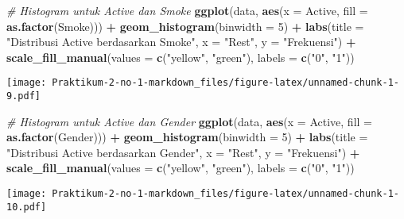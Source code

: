 \documentclass[
]{article}
\newenvironment{Shaded}{\begin{snugshade}}{\end{snugshade}}
\newcommand{\AttributeTok}[1]{\textcolor[rgb]{0.13,0.29,0.53}{#1}}
\newcommand{\CommentTok}[1]{\textcolor[rgb]{0.56,0.35,0.01}{\textit{#1}}}
\newcommand{\DecValTok}[1]{\textcolor[rgb]{0.00,0.00,0.81}{#1}}
\newcommand{\FunctionTok}[1]{\textcolor[rgb]{0.13,0.29,0.53}{\textbf{#1}}}
\newcommand{\NormalTok}[1]{#1}
\newcommand{\SpecialCharTok}[1]{\textcolor[rgb]{0.81,0.36,0.00}{\textbf{#1}}}
\newcommand{\StringTok}[1]{\textcolor[rgb]{0.31,0.60,0.02}{#1}}
\begin{document}
\begin{Shaded}
\begin{Highlighting}[]
\CommentTok{\# Histogram untuk Active dan Smoke}
\FunctionTok{ggplot}\NormalTok{(data, }\FunctionTok{aes}\NormalTok{(}\AttributeTok{x =}\NormalTok{ Active, }\AttributeTok{fill =} \FunctionTok{as.factor}\NormalTok{(Smoke))) }\SpecialCharTok{+}
  \FunctionTok{geom\_histogram}\NormalTok{(}\AttributeTok{binwidth =} \DecValTok{5}\NormalTok{) }\SpecialCharTok{+}
  \FunctionTok{labs}\NormalTok{(}\AttributeTok{title =} \StringTok{"Distribusi Active berdasarkan Smoke"}\NormalTok{,}
       \AttributeTok{x =} \StringTok{"Rest"}\NormalTok{,}
       \AttributeTok{y =} \StringTok{"Frekuensi"}\NormalTok{) }\SpecialCharTok{+}
  \FunctionTok{scale\_fill\_manual}\NormalTok{(}\AttributeTok{values =} \FunctionTok{c}\NormalTok{(}\StringTok{"yellow"}\NormalTok{, }\StringTok{"green"}\NormalTok{), }\AttributeTok{labels =} \FunctionTok{c}\NormalTok{(}\StringTok{"0"}\NormalTok{, }\StringTok{"1"}\NormalTok{))}
\end{Highlighting}
\end{Shaded}

\texttt{[image: Praktikum-2-no-1-markdown\_files/figure-latex/unnamed-chunk-1-9.pdf]}

\begin{Shaded}
\begin{Highlighting}[]
\CommentTok{\# Histogram untuk Active dan Gender}
\FunctionTok{ggplot}\NormalTok{(data, }\FunctionTok{aes}\NormalTok{(}\AttributeTok{x =}\NormalTok{ Active, }\AttributeTok{fill =} \FunctionTok{as.factor}\NormalTok{(Gender))) }\SpecialCharTok{+}
  \FunctionTok{geom\_histogram}\NormalTok{(}\AttributeTok{binwidth =} \DecValTok{5}\NormalTok{) }\SpecialCharTok{+}
  \FunctionTok{labs}\NormalTok{(}\AttributeTok{title =} \StringTok{"Distribusi Active berdasarkan Gender"}\NormalTok{,}
       \AttributeTok{x =} \StringTok{"Rest"}\NormalTok{,}
       \AttributeTok{y =} \StringTok{"Frekuensi"}\NormalTok{) }\SpecialCharTok{+}
  \FunctionTok{scale\_fill\_manual}\NormalTok{(}\AttributeTok{values =} \FunctionTok{c}\NormalTok{(}\StringTok{"yellow"}\NormalTok{, }\StringTok{"green"}\NormalTok{), }
                    \AttributeTok{labels =} \FunctionTok{c}\NormalTok{(}\StringTok{"0"}\NormalTok{, }\StringTok{"1"}\NormalTok{))}
\end{Highlighting}
\end{Shaded}

\texttt{[image: Praktikum-2-no-1-markdown\_files/figure-latex/unnamed-chunk-1-10.pdf]}
\end{document}

